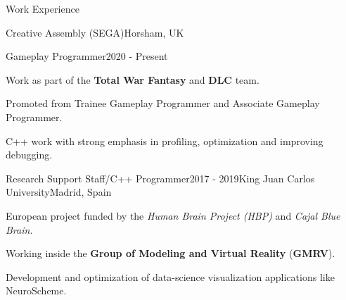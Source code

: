 \documentclass{resume} %
\begin{document}

\begin{mainSection}{Work Experience}



\begin{multiWorkExperience}
{Creative Assembly (SEGA)}{Horsham, UK}

\begin{multiWorkJob}
{Gameplay Programmer}{2020 - Present}

Work as part of the \textbf{Total War Fantasy} and \textbf{DLC} team.

Promoted from Trainee Gameplay Programmer and Associate Gameplay Programmer.

C++ work with strong emphasis in profiling, optimization and improving debugging.
\end{multiWorkJob}

\end{multiWorkExperience}

\begin{singleWorkExperience}
{Research Support Staff/C++ Programmer}{2017 - 2019}{King Juan Carlos University}{Madrid, Spain}

European project funded by the \textit{Human Brain Project (HBP)} and \textit{Cajal Blue Brain}.

Working inside the {\textbf{Group of Modeling and Virtual Reality}} (\textbf{GMRV}).

Development and optimization of  data-science visualization applications like NeuroScheme.

\end{singleWorkExperience}

\end{mainSection}
\end{document}
